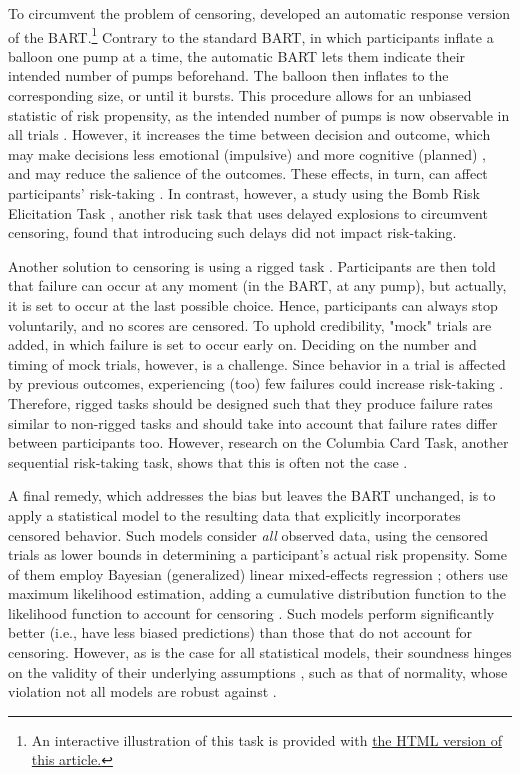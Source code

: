 \documentclass[serif, twocolumn, authordate, meta]{jote-article}
\begin{document}
\renewcommand{\thefootnote}{\fnsymbol{footnote}}
To circumvent the problem of censoring, \textcite{Pleskac2008} developed an automatic response version of the BART.\footnote{An interactive illustration of this task is provided with  \href{https://archive.jtrialerror.com/pub/burstbeliefs/\#censored-observations}{the HTML version of this article.}} Contrary to the standard BART, in which participants inflate a balloon one pump at a time, the automatic BART lets them indicate their intended number of pumps beforehand. The balloon then inflates to the corresponding size, or until it bursts. This procedure allows for an unbiased statistic of risk propensity, as the intended number of pumps is now observable in all trials \parencite{Pleskac2008}. However, it increases the time between decision and outcome, which may make decisions less emotional (impulsive) and more cognitive (planned) \parencite{Pleskac2008}, and may reduce the salience of the outcomes. These effects, in turn, can affect participants' risk-taking \parencite{Young2019}. In contrast, however, a study using the Bomb Risk Elicitation Task \parencite[BRET; ][]{Crosetto2013}, another risk task that uses delayed explosions to circumvent censoring, found that introducing such delays did not impact risk-taking.


\renewcommand{\thefootnote}{\arabic{footnote}}
Another solution to censoring is using a rigged task \parencite{Slovic1966}. Participants are then told that failure can occur at any moment (in the BART, at any pump), but actually, it is set to occur at the last possible choice. Hence, participants can always stop voluntarily, and no scores are censored. To uphold credibility, "mock" trials are added, in which failure is set to occur early on. Deciding on the number and timing of mock trials, however, is a challenge. Since behavior in a trial is affected by previous outcomes, experiencing (too) few failures could increase risk-taking \parencite{deGroot2019,Dijkstra2020}. Therefore, rigged tasks should be designed such that they produce failure rates similar to non-rigged tasks and should take into account that failure rates differ between participants too. However, research on the Columbia Card Task, another sequential risk-taking task, shows that this is often not the case \parencite{deGroot2019}.

A final remedy, which addresses the bias but leaves the BART unchanged, is to apply a statistical model to the resulting data that explicitly incorporates censored behavior. Such models consider \emph{all} observed data, using the censored trials as lower bounds in determining a participant's actual risk propensity. Some of them employ Bayesian (generalized) linear mixed-effects regression \parencite{Weller2019, Young2019}; others use maximum likelihood estimation, adding a cumulative distribution function to the likelihood function to account for censoring \parencite{Dijkstra2020,Tobin1958}. Such models perform significantly better (i.e., have less biased predictions) than those that do not account for censoring. However, as is the case for all statistical models, their soundness hinges on the validity of their underlying assumptions \parencite{Schafer2002}, such as that of normality, whose violation not all models are robust against \parencite{Powell1984}.
\end{document}

